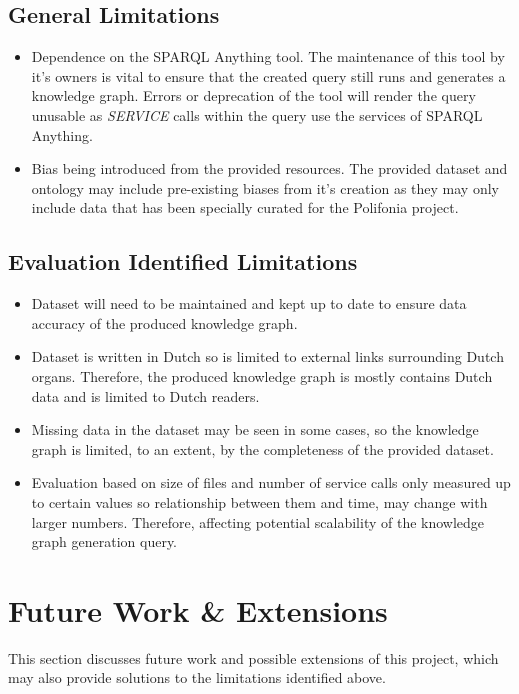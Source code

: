 \subsection{General Limitations}
\begin{itemize}
    \item Dependence on the SPARQL Anything tool. The maintenance of this tool by it's owners is vital to ensure that the created query still runs and generates a knowledge graph. Errors or deprecation of the tool will render the query unusable as \textit{SERVICE} calls within the query use the services of SPARQL Anything. 
    \item Bias being introduced from the provided resources. The provided dataset and ontology may include pre-existing biases from it's creation as they may only include data that has been specially curated for the Polifonia project. 
\end{itemize}

\subsection{Evaluation Identified Limitations}
\begin{itemize}
    \item Dataset will need to be maintained and kept up to date to ensure data accuracy of the produced knowledge graph. 
    \item Dataset is written in Dutch so is limited to external links surrounding Dutch organs. Therefore, the produced knowledge graph is mostly contains Dutch data and is limited to Dutch readers.  
    \item Missing data in the dataset may be seen in some cases, so the knowledge graph is limited, to an extent, by the completeness of the provided dataset.
    \item  Evaluation based on size of files and number of service calls only measured up to certain values so relationship between them and time, may change with larger numbers. Therefore, affecting potential scalability of the knowledge graph generation query. 
\end{itemize}

\section{Future Work \& Extensions}
This section discusses future work and possible extensions of this project, which may also provide solutions to the limitations identified above.

